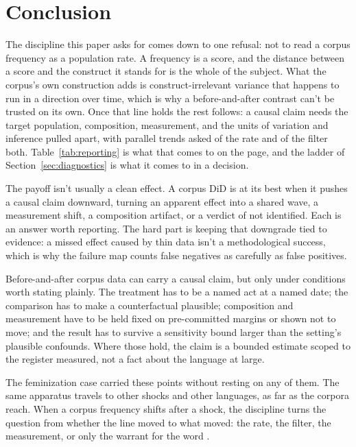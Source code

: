 \section{Conclusion}
\label{sec:conclusion}

The discipline this paper asks for comes down to one refusal: not to read a corpus frequency as a population rate. A frequency is a score, and the distance between a score and the construct it stands for is the whole of the subject. What the corpus's own construction adds is construct-irrelevant variance that happens to run in a direction over time, which is why a before-and-after contrast can't be trusted on its own. Once that line holds the rest follows: a causal claim needs the target population, composition, measurement, and the units of variation and inference pulled apart, with parallel trends asked of the rate and of the filter both. Table~\ref{tab:reporting} is what that comes to on the page, and the ladder of Section~\ref{sec:diagnostics} is what it comes to in a decision.

The payoff isn't usually a clean effect. A corpus DiD is at its best when it pushes a causal claim downward, turning an apparent effect into a shared wave, a measurement shift, a composition artifact, or a verdict of not identified. Each is an answer worth reporting. The hard part is keeping that downgrade tied to evidence: a missed effect caused by thin data isn't a methodological success, which is why the failure map counts false negatives as carefully as false positives.

Before-and-after corpus data can carry a causal claim, but only under conditions worth stating plainly. The treatment has to be a named act at a named date; the comparison has to make a counterfactual plausible; composition and measurement have to be held fixed on pre-committed margins or shown not to move; and the result has to survive a sensitivity bound larger than the setting's plausible confounds. Where those hold, the claim is a bounded estimate scoped to the register measured, not a fact about the language at large.

The feminization case carried these points without resting on any of them. The same apparatus travels to other shocks and other languages, as far as the corpora reach. When a corpus frequency shifts after a shock, the discipline turns the question from whether the line moved to what moved: the rate, the filter, the measurement, or only the warrant for the word .
